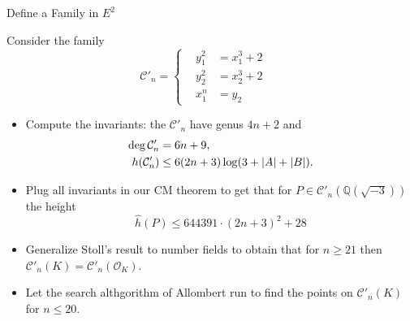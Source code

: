 \documentclass[12pt]{beamer}
\newcommand{\qe}{\mathbb{Q}}
\newcommand{\Ci}{\mathcal{C}}
\begin{document}
\begin{frame}{Define a Family in $E^2$}
\begin{example}Consider the family \begin{equation*}
\mathcal{C}'_n=\begin{cases}
\,\,\,\,\,y_1^2&=x_1^3+2\,\,\,\,\,\,\,\,\\
\,\,\,\,\,y_2^2&=x_2^3+2\,\,\,\,\,\,\,\,\\
\,\,\,\,\,x_1^n&=y_2
\end{cases}
\end{equation*}
\end{example}

\pause

 \begin{itemize}
 \item Compute the invariants: 
 the  $\Ci'_n$ have genus $4n+2$ and 
\begin{align}
\begin{split}
 \notag  \deg \Ci'_n&= 6n+9,\\
 \notag  h(\Ci'_n)&\leq 6(2n+3)\log( 3+|A|+|B|).
\end{split}
\end{align}


 
 
\item Plug all invariants  in our CM theorem  to get  that for $P\in\Ci'_n(\qe(\sqrt{-3}))$ the height
$$\hat{h}(P)\leq 644391 \cdot (2n+3)^2+28
$$

\item Generalize Stoll's result to number fields to obtain that for $n\ge 21$ then $\Ci'_n(K)=\Ci'_n(\mathcal{O}_K)$.

\item Let  the search althgorithm of Allombert run to find the points on $\Ci'_n(K)$ for $n\le 20$.
\end{itemize}
\end{frame}
\end{document}
